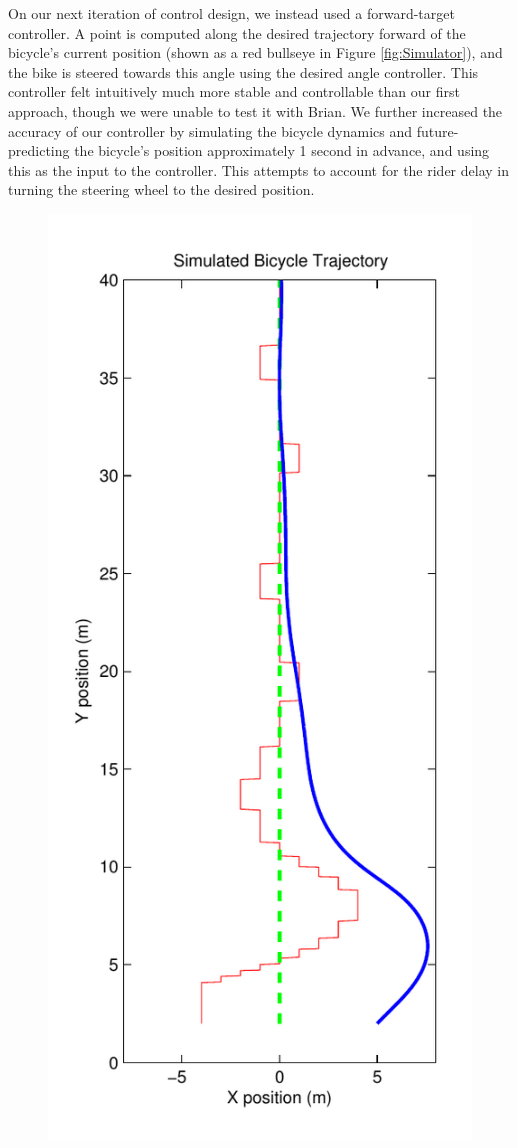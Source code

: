 \documentclass[aps,twocolumn,secnumarabic,balancelastpage,amsmath,amssymb,nofootinbib]{revtex4-1}
\begin{document}
On our next iteration of control design, we instead used a forward-target controller. A point is computed along the desired trajectory forward of the bicycle's current position (shown as a red bullseye in Figure \ref{fig:Simulator}), and the bike is steered towards this angle using the desired angle controller. This controller felt intuitively much more stable and controllable than our first approach, though we were unable to test it with Brian. We further increased the accuracy of our controller by simulating the bicycle dynamics and future-predicting the bicycle's position approximately 1 second in advance, and using this as the input to the controller. This attempts to account for the rider delay in turning the steering wheel to the desired position.

\begin{figure}
\includegraphics[scale=0.5]{stabilized-1-with-correction.pdf}

\end{figure}
\end{document}
